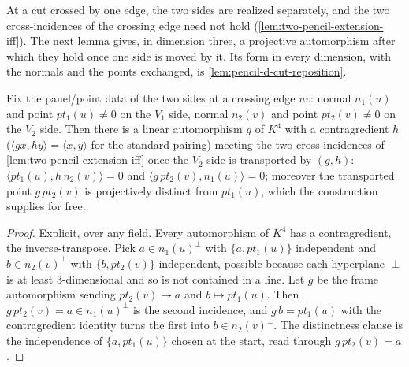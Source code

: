 At a cut crossed by one edge, the two sides are realized separately, and
the two cross-incidences of the crossing edge need not hold
(\cref{lem:two-pencil-extension-iff}). The next lemma gives, in dimension
three, a projective automorphism after which they hold once one side is
moved by it. Its form in every dimension, with the normals and the points
exchanged, is \cref{lem:pencil-d-cut-reposition}.

\begin{lemma}
  \label{lem:pencil-cut-nondegeneracy}
  \leanok
  Fix the panel/point data of the two sides at a crossing edge $uv$: normal
  $n_1(u)$ and point $pt_1(u) \ne 0$ on the $V_1$ side, normal $n_2(v)$ and
  point $pt_2(v) \ne 0$ on the $V_2$ side. Then there is a linear
  automorphism $g$ of $K^4$ with a contragredient $h$ ($\langle g x, h
  y\rangle = \langle x, y\rangle$ for the standard pairing) meeting the two
  cross-incidences of \cref{lem:two-pencil-extension-iff} once the $V_2$
  side is transported by $(g, h)$: $\langle pt_1(u), h\, n_2(v)\rangle = 0$
  and $\langle g\, pt_2(v), n_1(u)\rangle = 0$; moreover the transported
  point $g\, pt_2(v)$ is projectively distinct from $pt_1(u)$, which the
  construction supplies for free.
\end{lemma}
\begin{proof}
  \leanok
  Explicit, over any field. Every automorphism of $K^4$ has a
  contragredient, the inverse-transpose. Pick $a \in n_1(u)^\perp$ with
  $\{a, pt_1(u)\}$ independent and $b \in n_2(v)^\perp$ with $\{b,
  pt_2(v)\}$ independent, possible because each hyperplane $\perp$ is at
  least $3$-dimensional and so is not contained in a line. Let $g$ be the
  frame automorphism sending $pt_2(v) \mapsto a$ and $b \mapsto pt_1(u)$.
  Then $g\, pt_2(v) = a \in n_1(u)^\perp$ is the second incidence, and $g\,
  b = pt_1(u)$ with the contragredient identity turns the first into $b \in
  n_2(v)^\perp$. The distinctness clause is the independence of $\{a,
  pt_1(u)\}$ chosen at the start, read through $g\, pt_2(v) = a$.
\end{proof}

